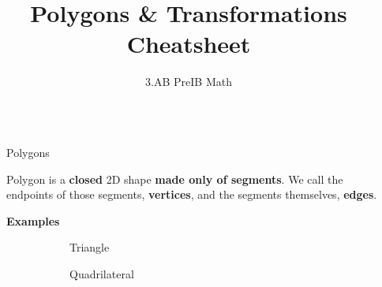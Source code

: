 \documentclass[final]{beamer}
\title{Polygons \& Transformations Cheatsheet}
\author{3.AB PreIB Math}
\institute[shortinst]{Adam Klepáč}
\newlength{\sepwidth}
\newlength{\colwidth}
\newcommand{\separatorcolumn}{\begin{column}{\sepwidth}\end{column}}
\newcommand{\bfalert}[1]{\textbf{\alert{#1}}}
\begin{document}

\begin{frame}[t]
\begin{columns}[t]
\separatorcolumn

\begin{column}{\colwidth}

  \begin{block}{Polygons}

   Polygon is a \bfalert{closed} 2D shape \bfalert{made only of segments}. We
   call the endpoints of those segments, \bfalert{vertices}, and the segments
   themselves, \bfalert{edges}.

   \textbf{Examples}
   \begin{figure}[H]
    \centering
    \begin{subfigure}[b]{.23\textwidth}
     \centering
     \caption*{Triangle}
    \end{subfigure}
    \begin{subfigure}[b]{.23\textwidth}
     \centering
     \caption*{Quadrilateral}
    \end{subfigure}
    \begin{subfigure}[b]{.23\textwidth}
     \centering
\end{subfigure}
\end{figure}
\end{block}
\end{column}
\end{columns}
\end{frame}
\end{document}
